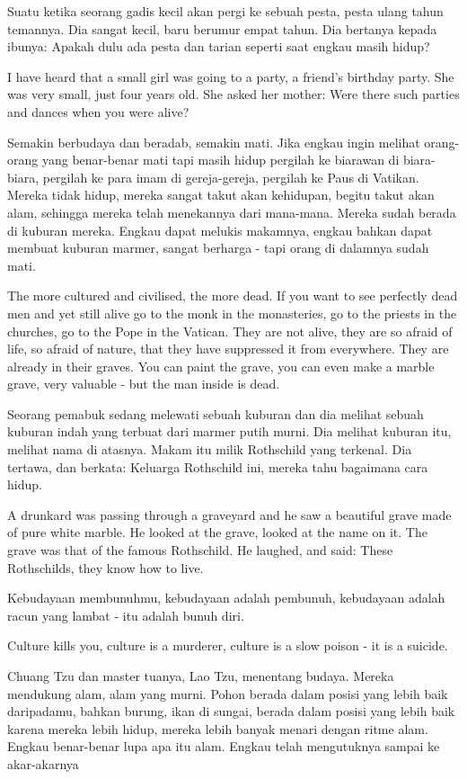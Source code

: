 \bahasa
Suatu ketika seorang gadis kecil akan pergi ke sebuah pesta, pesta ulang tahun temannya. Dia sangat kecil, baru berumur empat tahun. Dia bertanya kepada ibunya: Apakah dulu ada pesta dan tarian seperti saat engkau masih hidup?

\english
I have heard that a small girl was going to a party, a friend's birthday party. She was very small, just four years old. She asked her mother: Were there such parties and dances when you were alive?

\bahasa
Semakin berbudaya dan beradab, semakin mati. Jika engkau ingin melihat orang-orang yang benar-benar mati tapi masih hidup pergilah ke biarawan di biara-biara, pergilah ke para imam di gereja-gereja, pergilah ke Paus di Vatikan. Mereka tidak hidup, mereka sangat takut akan kehidupan, begitu takut akan alam, sehingga mereka telah menekannya dari mana-mana. Mereka sudah berada di kuburan mereka. Engkau dapat melukis makamnya, engkau bahkan dapat membuat kuburan marmer, sangat berharga - tapi orang di dalamnya sudah mati.

\english
The more cultured and civilised, the more dead. If you want to see perfectly dead men and yet still alive go to the monk in the monasteries, go to the priests in the churches, go to the Pope in the Vatican. They are not alive, they are so afraid of life, so afraid of nature, that they have suppressed it from everywhere. They are already in their graves. You can paint the grave, you can even make a marble grave, very valuable - but the man inside is dead.

\bahasa
Seorang pemabuk sedang melewati sebuah kuburan dan dia melihat sebuah kuburan indah yang terbuat dari marmer putih murni. Dia melihat kuburan itu, melihat nama di atasnya. Makam itu milik Rothschild yang terkenal. Dia tertawa, dan berkata: Keluarga Rothschild ini, mereka tahu bagaimana cara hidup.

\english
A drunkard was passing through a graveyard and he saw a beautiful grave made of pure white marble. He looked at the grave, looked at the name on it. The grave was that of the famous Rothschild. He laughed, and said: These Rothschilds, they know how to live.

\bahasa
Kebudayaan membunuhmu, kebudayaan adalah pembunuh, kebudayaan adalah racun yang lambat - itu adalah bunuh diri.

\english
Culture kills you, culture is a murderer, culture is a slow poison - it is a suicide.

\bahasa
Chuang Tzu dan master tuanya, Lao Tzu, menentang budaya. Mereka mendukung alam, alam yang murni. Pohon berada dalam posisi yang lebih baik daripadamu, bahkan burung, ikan di sungai, berada dalam posisi yang lebih baik karena mereka lebih hidup, mereka lebih banyak menari dengan ritme alam. Engkau benar-benar lupa apa itu alam. Engkau telah mengutuknya sampai ke akar-akarnya

